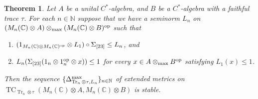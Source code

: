 \documentclass[11pt, a4paper, oneside, final, reqno]{amsart}
\newcommand{\bbN}{\mathbb{N}}
\newcommand{\bbC}{\mathbb{C}}
\newcommand{\TC}{\operatorname{TC}}
\newcommand{\Tr}{\operatorname{Tr}}
\theoremstyle{definition}
\theoremstyle{plain}
\newtheorem{theorem}[definition]{Theorem}
\theoremstyle{remark}
\numberwithin{equation}{section}
\begin{document}
\begin{theorem}\label{thm:stability 1}
    Let $A$ be a unital $C^*$-algebra, and $B$ be a $C^*$-algebra with a faithful trace $\tau$. For each $n \in \bbN$ suppose that we have a seminorm $L_n$ on $(M_n(\bbC) \otimes A) \otimes_{\rm max} (M_n(\bbC) \otimes B)^{\rm op}$ such that
    \begin{enumerate}
        \item $(1_{M_n(\bbC) \otimes M_n(\bbC)^{\rm op}} \otimes L_1) \circ \Sigma_{[23]} \leq L_n$, and
        \item $L_n(\Sigma_{[23]}(1_n \otimes 1_n^{\rm op} \otimes x)) \leq 1$ for every $x \in A \otimes_{\rm max} B^{\rm op}$ satisfying $L_1(x) \leq 1$.
    \end{enumerate}
    Then the sequence $\{\Delta_{\Tr_n \otimes \tau, L_n}^{\rm max}\}_{n \in \bbN}$ of extended metrics on $\TC_{\Tr_n \otimes \tau} (M_n (\bbC) \otimes A , M_n(\bbC) \otimes B)$ is stable.
\end{theorem}
\end{document}

